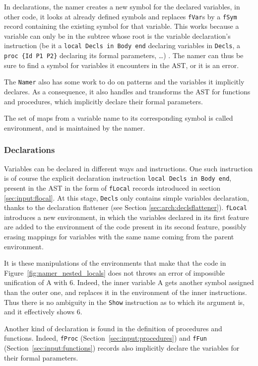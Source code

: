 \documentclass[a4paper]{memoir}
\begin{document}
In declarations, the namer creates a new symbol for the declared variables, in
other code, it looks at already defined symbols and replaces \lstinline!fVar!s
by a \lstinline!fSym! record containing the existing symbol for that variable.
This works because a variable can only be in the subtree whose root is the
variable declaration's instruction (be it a \lstinline!local Decls in Body end!
declaring variables in \lstinline!Decls!, a
\lstinline!proc {Id P1 P2}! declaring its formal parameters, \ldots) . The namer
can thus be sure to find a symbol for variables it encounters in the AST, or it
is an error.

The \lstinline!Namer! also has some work to do on patterns and the variables it
implicitly declares. As a consequence, it also handles and transforms the AST
for functions and procedures, which implicitly declare their formal parameters.

The set of maps from a variable name to its corresponding symbol is called environment, and is maintained by the namer.


\subsubsection{Declarations}
Variables can be declared in different ways and instructions.
One such instruction is of course the explicit declaration instruction
\lstinline!local Decls in Body end!, present in the AST in the form of
\lstinline!fLocal! records introduced in section \ref{sec:input:flocal}. At this
stage, \lstinline!Decls! only contains simple variables declaration, thanks to
the declaration flattener (see Section \ref{sec:arch:declsflattener}).
\lstinline!fLocal! introduces a new environment, in which the variables declared
in its first feature are added to the environment of the code present in its
second feature, possibly erasing mappings for variables with the same name
coming from the parent environment. 

It is these manipulations of the environments that make that the code in
Figure~\ref{fig:namer_nested_locals} does not throws an error of impossible
unification of A with 6. Indeed, the inner variable A gets another symbol
assigned than the outer one, and replaces it in the environment of the inner
instructions. Thus there is no ambiguity in the \lstinline!Show! instruction as
to which its argument is, and it effectively shows 6.

Another kind of declaration is found in the definition of procedures and
functions. Indeed, \lstinline!fProc! (Section~\ref{sec:input:procedures}) and
\lstinline!fFun! (Section~\ref{sec:input:functions}) records also implicitly
declare the variables for their formal parameters. %
\end{document}
